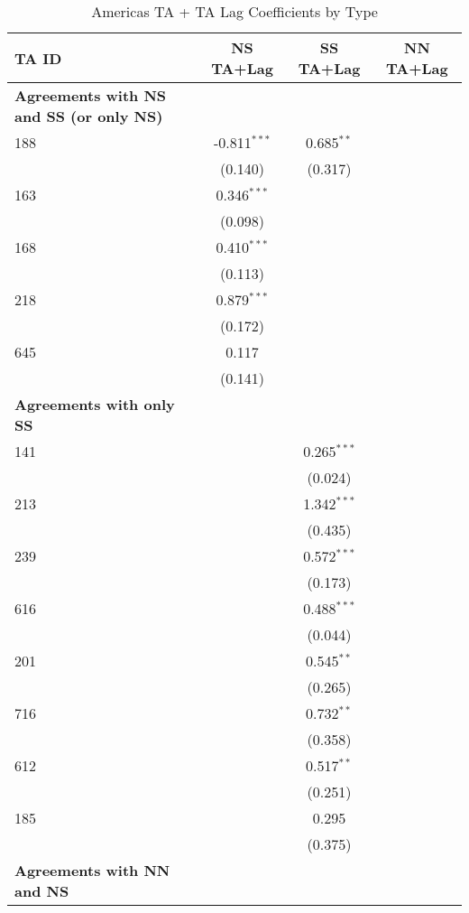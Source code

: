 \begin{table}[htbp]
    \centering
    \caption{Americas TA + TA Lag Coefficients by Type}
    \label{tab:americas_pta}
    \begin{adjustbox}{max width=\textwidth}
    \begin{tabular}{lccc}
    \hline
    \textbf{TA ID} & \textbf{NS TA+Lag} & \textbf{SS TA+Lag} & \textbf{NN TA+Lag} \\
    \hline
    \textbf{Agreements with NS and SS (or only NS)} &  &  &  \\
    \hline
    188 & -0.811$^{\ast\ast\ast}$ & 0.685$^{\ast\ast}$ &  \\
    & (0.140) & (0.317) & \\
    163 & 0.346$^{\ast\ast\ast}$ &  &  \\
    & (0.098) &  &  \\
    168 & 0.410$^{\ast\ast\ast}$ &  &  \\
    & (0.113) &  &  \\
    218 & 0.879$^{\ast\ast\ast}$ &  &  \\
    & (0.172) &  &  \\
    645 & 0.117 &  &  \\
    & (0.141) &  &  \\
    \hline
    \textbf{Agreements with only SS} &  &  &  \\
    \hline
    141 &  & 0.265$^{\ast\ast\ast}$ &  \\
    &  & (0.024) &  \\
    213 &  & 1.342$^{\ast\ast\ast}$ &  \\
    &  & (0.435) &  \\
    239 &  & 0.572$^{\ast\ast\ast}$ &  \\
    &  & (0.173) &  \\
    616 &  & 0.488$^{\ast\ast\ast}$ &  \\
    &  & (0.044) &  \\
    201 &  & 0.545$^{\ast\ast}$ &  \\
    &  & (0.265) &  \\
    716 &  & 0.732$^{\ast\ast}$ &  \\
    &  & (0.358) &  \\
    612 &  & 0.517$^{\ast\ast}$ &  \\
    &  & (0.251) &  \\
    185 &  & 0.295 &  \\
    &  & (0.375) &  \\
    \hline
    \textbf{Agreements with NN and NS} &  &  &  \\

\end{tabular}
\end{adjustbox}
\end{table}
